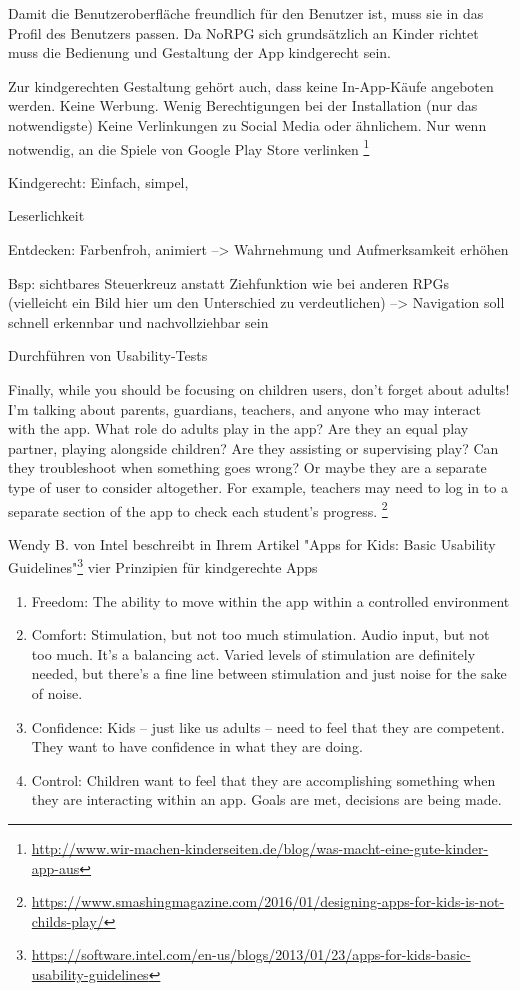 {		Damit die Benutzeroberfläche freundlich für den Benutzer ist, muss sie in das Profil des Benutzers passen. Da NoRPG sich grundsätzlich an Kinder richtet muss die Bedienung und Gestaltung der App kindgerecht sein. 
		
		Zur kindgerechten Gestaltung gehört auch, dass keine In-App-Käufe angeboten werden. Keine Werbung. Wenig Berechtigungen bei der Installation (nur das notwendigste)
		Keine Verlinkungen zu Social Media oder ähnlichem. Nur wenn notwendig, an die Spiele von Google Play Store verlinken \footnote{\url{http://www.wir-machen-kinderseiten.de/blog/was-macht-eine-gute-kinder-app-aus}}
		
		Kindgerecht: Einfach, simpel, 
		
		Leserlichkeit
		
		Entdecken: Farbenfroh, animiert --> Wahrnehmung und Aufmerksamkeit erhöhen
		
		Bsp: sichtbares Steuerkreuz anstatt Ziehfunktion wie bei anderen RPGs (vielleicht ein Bild hier um den Unterschied zu verdeutlichen)
		--> Navigation soll schnell erkennbar und nachvollziehbar sein
		
		Durchführen von Usability-Tests
		
		Finally, while you should be focusing on children users, don’t forget about adults! I’m talking about parents, guardians, teachers, and anyone who may interact with the app. What role do adults play in the app? Are they an equal play partner, playing alongside children? Are they assisting or supervising play? Can they troubleshoot when something goes wrong? Or maybe they are a separate type of user to consider altogether. For example, teachers may need to log in to a separate section of the app to check each student’s progress. \footnote{\url{https://www.smashingmagazine.com/2016/01/designing-apps-for-kids-is-not-childs-play/}}
		
		Wendy B. von Intel beschreibt in Ihrem Artikel "Apps for Kids: Basic Usability Guidelines"\footnote{\url{https://software.intel.com/en-us/blogs/2013/01/23/apps-for-kids-basic-usability-guidelines}} vier Prinzipien für kindgerechte Apps
		\begin{enumerate}
			\item{Freedom: The ability to move within the app within a controlled environment}
			\item{Comfort: Stimulation, but not too much stimulation. Audio input, but not too much. It’s a balancing act. Varied levels of stimulation are definitely needed, but there’s a fine line between stimulation and just noise for the sake of noise.}
			\item{Confidence: Kids – just like us adults – need to feel that they are competent. They want to have confidence in what they are doing.}
			\item{Control: Children want to feel that they are accomplishing something when they are interacting within an app. Goals are met, decisions are being made.}
		\end{enumerate}

}
